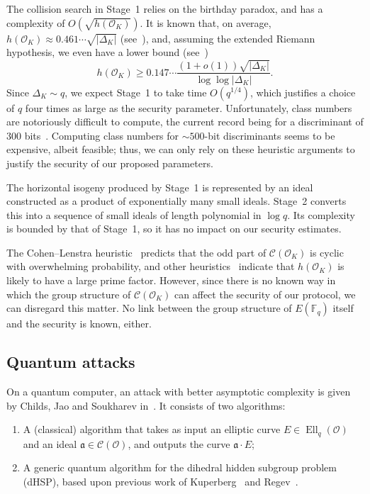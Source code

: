 \documentclass{llncs}
\newcommand{\F}{\mathbb{F}}
\newcommand{\Cl}{\mathcal{C}}
\renewcommand{\O}{\mathcal{O}}
\renewcommand{\frak}{\mathfrak}
\DeclareMathOperator{\Ell}{Ell}
\begin{document}
The collision search in Stage~1 relies on the birthday paradox, and
has a complexity of $O(\sqrt{h(\O_K)})$.
It is known that, on average,
$h(\O_K)≈0.461\cdots\sqrt{|Δ_K|}$ (see~\cite[5.10]{Cohen1993}), and,
assuming the extended Riemann hypothesis, we even have a lower bound
(see~\cite{littlewood1928class})
\[h(\O_K) ≥ 0.147\cdots\frac{(1+o(1))\sqrt{|Δ_K|}}{\log\log|Δ_K|}.\]
Since $Δ_K\sim q$, we expect Stage~1 to take time $O(q^{1/4})$,
which justifies a choice of $q$ four times as large as the
security parameter.  Unfortunately, class numbers are notoriously
difficult to compute, the current record being
for a discriminant of 300 bits~\cite{10.1007/978-3-642-14081-5_15}.
Computing class numbers for ${\sim 500}$-bit discriminants seems to be expensive,
albeit feasible; thus, we can only rely on these heuristic arguments
to justify the security of our proposed parameters.

The horizontal isogeny produced by Stage~1 is represented by an ideal
constructed as a product of exponentially many small ideals.
Stage~2 converts this into a sequence of small ideals of length
polynomial in \(\log q\).
Its complexity is bounded by that of Stage~1,
so it has no impact on our security estimates.

\begin{remark}
  The Cohen--Lenstra heuristic~\cite{10.1007/BFb0099440} predicts that
  the odd part of $\Cl(\O_K)$ is cyclic with overwhelming
  probability, and other heuristics~\cite{10.1007/3-540-44448-3_18}
  indicate that $h(\O_K)$ is likely to have a large prime factor.
  However, since there is no known way in which the group structure of
  $\Cl(\O_K)$ can affect the security of our protocol, we can 
  disregard this matter. No link between the group structure
	of $E(\F_q)$ itself and the security is known, either.
\end{remark}

\subsection{Quantum attacks}
\label{sec:quantum-attacks}

On a quantum computer, an attack with better asymptotic complexity is
given by Childs, Jao and Soukharev
in~\cite{childs2014constructing}. It consists of two algorithms:
\begin{enumerate}
\item A (classical) algorithm that takes as input an elliptic curve
  $E∈\Ell_q(\O)$ and an ideal $\frak a∈\Cl(\O)$, and outputs the curve
  $\frak a·E$;
\item A generic quantum algorithm for the dihedral hidden subgroup
  problem (dHSP), based upon previous work of Kuperberg~\cite{Kup,Kuperberg2013} and
  Regev~\cite{regev04}.
\end{enumerate}
\end{document}
